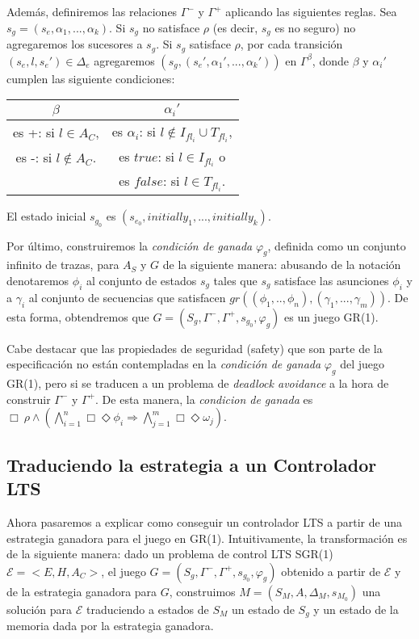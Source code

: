 Además, definiremos las relaciones $\Gamma^-$ y $\Gamma^+$ aplicando las siguientes reglas. Sea $s_g =
(s_e,\alpha_1,...,\alpha_k)$. Si $s_g$ no satisface $\rho$ (es decir, $s_g$ es no seguro) no agregaremos los sucesores a
$s_g$. Si $s_g$ satisface $\rho$, por cada transición $(s_e,l,s_e') \in \Delta_e$ agregaremos
$(s_g,(s_e',\alpha_1',...,\alpha_k'))$ en $\Gamma^{\beta}$, donde $\beta$ y $\alpha_i'$ cumplen las siguiente
condiciones:

\begin{center}
\begin{tabular}{ c | c}
$\beta$ & $\alpha_i'$ \\
\hline
es +: si $l \in A_C$, & es $\alpha_i$: si $l \notin I_{fl_i} \cup T_{fl_i}$, \\
es -: si $l \notin A_C$. & es $true$: si $l \in I_{fl_i}$ o \\
& es $false$: si $l \in T_{fl_i}$. \\
\end{tabular}
\end{center}

El estado inicial $s_{g_0}$ es $(s_{e_0},initially_1,...,initially_k)$.

Por último, construiremos la \emph{condición de ganada} $\varphi_g$, definida como un conjunto infinito de trazas, para
$A_S$ y $G$ de la siguiente manera: abusando de la notación denotaremos $\phi_i$ al conjunto de estados $s_g$ tales que
$s_g$ satisface las asunciones $\phi_i$ y a $\gamma_i$ al conjunto de secuencias que satisfacen
$gr((\phi_1,..,\phi_n),(\gamma_1,...,\gamma_m))$. De esta forma, obtendremos que $G = (S_g,\Gamma^-,\Gamma^+,s_{g_0},\varphi_g)$ es un
juego GR(1).

Cabe destacar que las propiedades de seguridad (safety) que son parte de la especificación no están contempladas en la
\emph{condición de ganada} $\varphi_g$ del juego GR(1), pero si se traducen a un problema de \emph{deadlock avoidance} a
la hora de construir $\Gamma^-$ y $\Gamma^+$. De esta manera, la \emph{condicion de ganada} es  $\Box\ \rho
\wedge(\bigwedge_{i=1}^n\Box\Diamond\phi_i \Rightarrow \bigwedge_{j=1}^m \Box\Diamond\omega_j)$.

\subsection{Traduciendo la estrategia a un Controlador LTS}

Ahora pasaremos a explicar como conseguir un controlador LTS a partir de una estrategia ganadora para el juego en GR(1).
Intuitivamente, la transformación es de la siguiente manera: dado un problema de control LTS SGR(1) $\mathcal{E} =
<E,H,A_C>$, el juego $G = (S_g, \Gamma^-, \Gamma^+, s_{g_0},\varphi_g)$ obtenido a partir de $\mathcal{E}$ y de la
estrategia ganadora para $G$, construimos $M = (S_M,A,\Delta_M,s_{M_0})$ una solución para $\mathcal{E}$ traduciendo
a estados de $S_M$ un estado de $S_g$ y un estado de la memoria dada por la estrategia ganadora.

